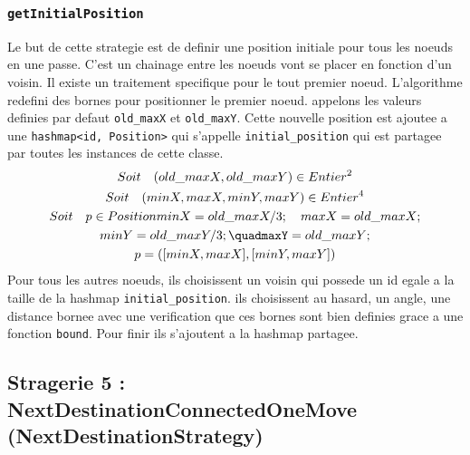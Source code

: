 \documentclass[11pt,a4paper,sans]{report}
\begin{document}
	\subsubsection{\texttt{getInitialPosition}}
	Le but de cette strategie est de definir une position initiale pour tous les noeuds en une passe. C'est un chainage entre les noeuds vont se placer en fonction d'un voisin. Il existe un traitement specifique pour le tout premier noeud. L'algorithme redefini des bornes pour positionner le premier noeud. appelons les valeurs definies par defaut \texttt{old\_maxX} et \texttt{old\_maxY}. Cette nouvelle position est ajoutee a une \texttt{hashmap<id, Position>} qui s'appelle \texttt{initial\_position} qui est partagee par toutes les instances de cette classe.
	\begin{gather}
		Soit \quad (old\_maxX,old\_maxY) \in Entier^2 \\
		Soit \quad (minX,maxX,minY,maxY) \in Entier^4 \\
		Soit \quad p \in Position
		minX = old\_maxX / 3; \quad maxX = old\_maxX; \\
		minY = old\_maxY / 3; \quadmaxY = old\_maxY;\\
		p = ([minX, maxX], [minY, maxY]) \\
	\end{gather}
	Pour tous les autres noeuds,  ils choisissent un voisin qui possede un id egale a la taille de la hashmap \texttt{initial\_position}. ils choisissent au hasard, un angle, une distance bornee avec une verification que ces bornes sont bien definies grace a une fonction \texttt{bound}.
	Pour finir ils s'ajoutent a  la hashmap partagee.


	\subsection*{Stragerie 5 : NextDestinationConnectedOneMove (NextDestinationStrategy)}
\end{document}
